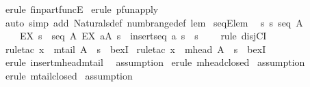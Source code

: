 \begin{isabellebody}
\isamarkupfalse%
\ {\isacharparenleft}erule\ fin{\isacharunderscore}part{\isacharunderscore}funcE{\isacharparenright}\isanewline
{}\isamarkupfalse%
\ {\isacharparenleft}erule\ pfun{\isacharunderscore}apply{\isacharparenright}\isanewline
{}\isamarkupfalse%
\ {\isacharparenleft}auto\ simp\ add{\isacharcolon}\ Naturals{\isacharunderscore}def\ numb{\isacharunderscore}range{\isacharunderscore}def\ lem{}{\isacharparenright}\isanewline
{}\isamarkupfalse%
%
\endisatagproof
{\isafoldproof}%
%
\isadelimproof
\isanewline
%
\endisadelimproof
\isanewline
{}\isamarkupfalse%
\ seqE{\isacharunderscore}lem{\isacharcolon}\ \isanewline
{\isachardoublequoteopen}{\isacharbang}{\isacharbang}\ s{\isachardot}\ s{\isacharcolon}\ seq\ A\ \ \isanewline
\ \ \ {\isacharequal}{\isacharequal}{\isachargreater}\ {\isacharparenleft}EX\ s{\isacharprime}\ {\isacharcolon}\ seq\ A{\isachardot}\ EX\ a{\isacharcolon}A{\isachardot}\ s\ {\isacharequal}\ insertseq\ a\ s{\isacharprime}{\isacharparenright}\ {\isacharbar}\ s\ {\isacharequal}\ {\isacharpercent}{\isacharless}{\isacharpercent}{\isachargreater}\ {\isachardoublequoteclose}\isanewline
%
\isadelimproof
%
\endisadelimproof
%
\isatagproof
{}\isamarkupfalse%
\ {\isacharparenleft}rule\ disjCI{\isacharparenright}\isanewline
{}\isamarkupfalse%
\ {\isacharparenleft}rule{\isacharunderscore}tac\ x\ {\isacharequal}\ {\isachardoublequoteopen}mtail\ A\ {\isacharpercent}{\isacharcircum}\ s{\isachardoublequoteclose}\ \ bexI{\isacharparenright}\isanewline
{}\isamarkupfalse%
\ {\isacharparenleft}rule{\isacharunderscore}tac\ x\ {\isacharequal}\ {\isachardoublequoteopen}mhead\ A\ {\isacharpercent}{\isacharcircum}\ s{\isachardoublequoteclose}\ \ bexI{\isacharparenright}\isanewline
{}\isamarkupfalse%
\ {\isacharparenleft}erule\ insert{\isacharunderscore}mhead{\isacharunderscore}mtail{\isacharparenright}\ \isanewline
{}\isamarkupfalse%
\ assumption\isanewline
{}\isamarkupfalse%
\ {\isacharparenleft}erule\ mhead{\isacharunderscore}closed{\isacharparenright}\isanewline
{}\isamarkupfalse%
\ assumption\isanewline
{}\isamarkupfalse%
\ {\isacharparenleft}erule\ mtail{\isacharunderscore}closed{\isacharparenright}\isanewline
{}\isamarkupfalse%
\ assumption\isanewline
{}\isamarkupfalse%
%
\endisatagproof
{\isafoldproof}%
%
\isadelimproof
\isanewline
%
\endisadelimproof
\isanewline
\isanewline

\end{isabellebody}
